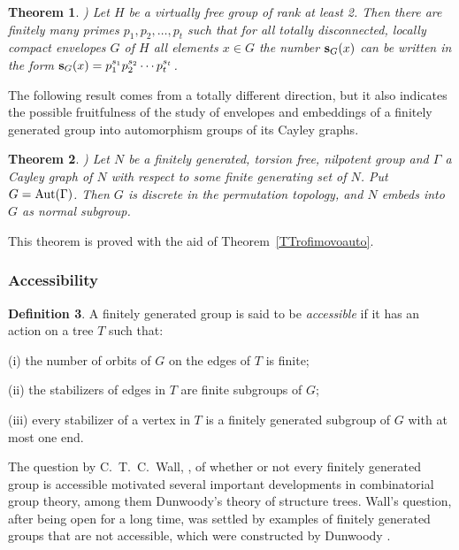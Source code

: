 \documentclass{emsprocart}
\newtheorem{theorem}{Theorem}[section]
\theoremstyle{definition}
\newtheorem{definition}[theorem]{Definition}
\begin{document}
\begin{theorem}{\rm \cite[Corollary 11]{Baumgartner2007})}
Let $H$ be a virtually free group of rank at least 2.  Then there are
finitely many primes $p_1, p_2, \ldots, p_t$ such that
 for all totally disconnected, locally
compact envelopes $G$ of $H$ all elements $x\in G$
the number ${\bf s}_G(x)$ can be written in the
form ${\bf s}_G(x)=p_1^{s_1}p_2^{s_2}\cdots  p_t^{s_t}$.
\end{theorem}

The following result comes from a totally different direction, but it also
indicates the possible fruitfulness of the
study of envelopes and embeddings of a finitely
generated group into automorphism groups of its Cayley graphs.

\begin{theorem}{\rm \cite[Theorem~4.1]{MollerSeifter1998})}
Let $N$ be a finitely generated, torsion free, nilpotent group and
$\Gamma$ a Cayley graph of $N$ with respect to some finite generating
set of $N$. Put $G={\mbox{${\rm Aut}(\Gamma)$}}$.  Then $G$ is discrete in the permutation
topology, and $N$ embeds into $G$ as normal subgroup.
\end{theorem}

This theorem is proved with the aid of Theorem~\ref{TTrofimovoauto}.

\subsubsection{Accessibility}
\begin{definition}\label{DAccessibility}
A finitely generated group is said to be {\em accessible} if it has an
action on a tree $T$ such that:

{(i)} the number of orbits of $G$ on the edges of $T$ is finite;

{(ii)} the stabilizers of edges in $T$ are finite subgroups of
$G$;

{(iii)} every stabilizer of a vertex in $T$ is a finitely
generated subgroup of $G$ with at most one end.
\end{definition}

The question by C.~T.~C.~Wall, \cite{Wall1971}, of whether or not every
finitely generated group is accessible  motivated several important
developments in combinatorial group theory, among them
Dunwoody's theory of structure trees. Wall's question,  after being
open for a long time, was settled by examples of finitely generated
groups that are not accessible, which were constructed by Dunwoody \cite{Dunwoody1991}.
\end{document}
